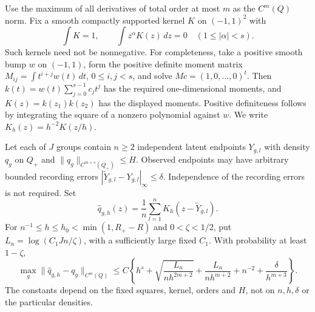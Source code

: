 Use the maximum of all derivatives of total order at most $m$ as the
$C^m(Q)$ norm.  Fix a smooth compactly supported kernel $K$ on
$(-1,1)^2$ with
\[
 \int K=1,\qquad \int z^\alpha K(z)\,dz=0
                   \quad(1\le|\alpha|<s).
\]
Such kernels need not be nonnegative.  For completeness, take a positive
smooth bump $w$ on $(-1,1)$, form the positive definite moment matrix
$M_{ij}=\int t^{i+j}w(t)\,dt$, $0\le i,j<s$, and solve
$Mc=(1,0,\ldots,0)^t$.  Then
$k(t)=w(t)\sum_{j=0}^{s-1}c_jt^j$ has the required one-dimensional
moments, and $K(z)=k(z_1)k(z_2)$ has the displayed moments.  Positive
definiteness follows by integrating the square of a nonzero polynomial
against $w$.  We write $K_h(z)=h^{-2}K(z/h)$.

\begin{lemma}
\label{lem:v69-density-estimation}
Let each of $J$ groups contain $n\ge2$ independent latent endpoints
$Y_{g,l}$ with density $q_g$ on $Q_+$ and
$\|q_g\|_{C^{m+s}(Q_+)}\le H$.  Observed endpoints may have arbitrary
bounded recording errors
$|\widetilde Y_{g,l}-Y_{g,l}|_\infty\le\delta$.
Independence of the recording errors is not required.  Set
\[
 \widehat q_{g,h}(z)=\frac1n\sum_{l=1}^n
                               K_h(z-\widetilde Y_{g,l}).
\]
For $n^{-1}\le h\le h_0<\min(1,R_+-R)$ and $0<\zeta<1/2$, put
$L_n=\log(C_1Jn/\zeta)$, with a sufficiently large fixed $C_1$.
With probability at least $1-\zeta$,
\begin{equation}\label{eq:v69-density-bound}
 \max_g\|\widehat q_{g,h}-q_g\|_{C^m(Q)}
 \le C\left\{h^s+
 \sqrt{\frac{L_n}{nh^{2m+2}}}+
 \frac{L_n}{nh^{m+2}}+n^{-2}+
 \frac{\delta}{h^{m+3}}\right\}.
\end{equation}
The constants depend on the fixed squares, kernel, orders and $H$, not
on $n,h,\delta$ or the particular densities.
\end{lemma}
